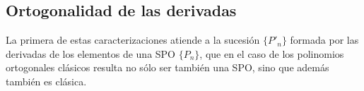 \subsection{Ortogonalidad de las derivadas}

La primera de estas caracterizaciones atiende a la sucesión $\{P'_n\}$ formada por las derivadas de los elementos de una SPO $\{P_n\}$, que en el caso de los polinomios ortogonales clásicos resulta no sólo ser también una SPO, sino que además también es clásica.

